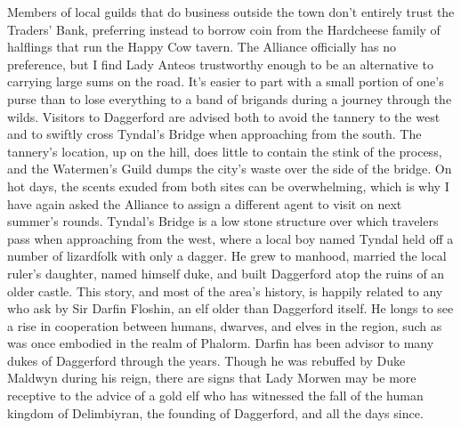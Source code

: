 \documentclass[10pt,a4paper,twoside,twocolumn,openany,bg=print,nodeprecatedcode]{dndbook}
\begin{document}
Members of local guilds that do business outside the town don't entirely trust the Traders' Bank, preferring instead to borrow coin from the Hardcheese family of halflings that run the Happy Cow tavern. The Alliance officially has no preference, but I find Lady Anteos trustworthy enough to be an alternative to carrying large sums on the road. It's easier to part with a small portion of one's purse than to lose everything to a band of brigands during a journey through the wilds.
Visitors to Daggerford are advised both to avoid the tannery to the west and to swiftly cross Tyndal's Bridge when approaching from the south. The tannery's location, up on the hill, does little to contain the stink of the process, and the Watermen's Guild dumps the city's waste over the side of the bridge. On hot days, the scents exuded from both sites can be overwhelming, which is why I have again asked the Alliance to assign a different agent to visit on next summer's rounds.
Tyndal's Bridge is a low stone structure over which travelers pass when approaching from the west, where a local boy named Tyndal held off a number of lizardfolk with only a dagger. He grew to manhood, married the local ruler's daughter, named himself duke, and built Daggerford atop the ruins of an older castle. This story, and most of the area's history, is happily related to any who ask by Sir Darfin Floshin, an elf older than Daggerford itself. He longs to see a rise in cooperation between humans, dwarves, and elves in the region, such as was once embodied in the realm of Phalorm. Darfin has been advisor to many dukes of Daggerford through the years. Though he was rebuffed by Duke Maldwyn during his reign, there are signs that Lady Morwen may be more receptive to the advice of a gold elf who has witnessed the fall of the human kingdom of Delimbiyran, the founding of Daggerford, and all the days since.
\end{document}
